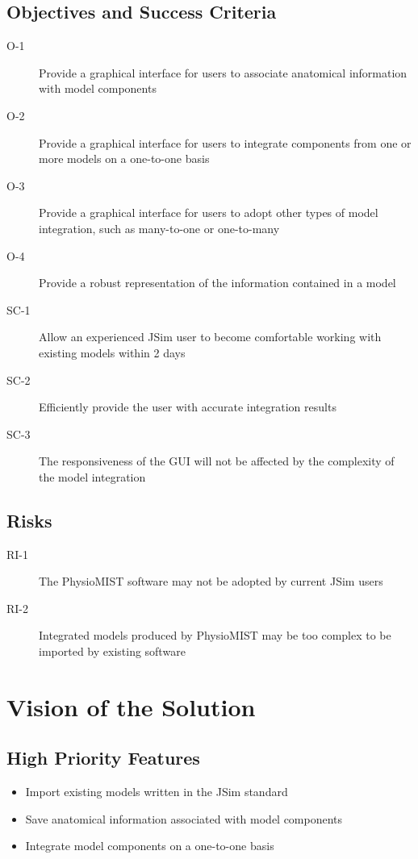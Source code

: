\documentclass{article}
\begin{document}
\subsection{Objectives and Success Criteria}
\begin{description}
\item[O-1] Provide a graphical interface for users to associate anatomical information with model components
\item[O-2] Provide a graphical interface for users to integrate components from one or more models on a one-to-one basis
\item[O-3] Provide a graphical interface for users to adopt other types of model integration, such as many-to-one or one-to-many
\item[O-4] Provide a robust representation of the information contained in a model
\item[SC-1] Allow an experienced JSim user to become comfortable working with existing models within 2 days
\item[SC-2] Efficiently provide the user with accurate integration results
\item[SC-3] The responsiveness of the GUI will not be affected by the complexity of the model integration
\end{description}

\subsection{Risks}
\begin{description}
\item[RI-1] The PhysioMIST software may not be adopted by current JSim users
\item[RI-2] Integrated models produced by PhysioMIST may be too complex to be imported by existing software
\end{description}

\section{Vision of the Solution}
\subsection{High Priority Features}
\begin{itemize}
\item Import existing models written in the JSim standard
\item Save anatomical information associated with model components
\item Integrate model components on a one-to-one basis
\end{itemize}
\end{document}
